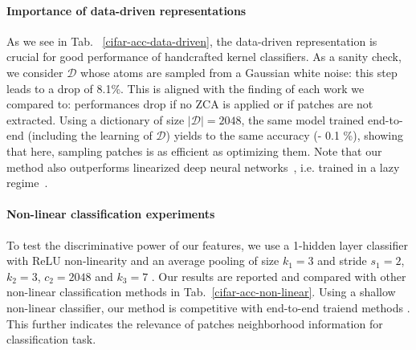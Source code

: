 \documentclass{article} %
\begin{document}
\paragraph{Importance of data-driven representations}
As we see in Tab. ~\ref{cifar-acc-data-driven}, the data-driven representation is crucial for good performance of handcrafted kernel classifiers.
As a sanity check, we consider $\mathcal{D}$ whose atoms are sampled from  a  Gaussian white noise: this  step leads to a drop of  8.1\%. This is aligned with the finding of each work we compared to: performances drop if no ZCA  is applied or if patches are not extracted. Using a dictionary of size $|\mathcal{D}| = 2048$, the same model trained end-to-end  (including the learning of $\mathcal{D}$) yields to the same accuracy (- 0.1 \%), showing that here, sampling  patches is as efficient as optimizing them. Note that our method also outperforms linearized deep neural networks~\citep{samarin2020empirical}, i.e. trained in a lazy regime~\citep{chizat2019lazy}.
\paragraph{Non-linear classification experiments}
To test the discriminative power of our features, we  use a 1-hidden layer classifier with ReLU non-linearity and an average pooling of size $k_1=3$ and stride $s_1=2$, $k_2=3$, $c_2=2048$ and $k_3=7$ .
Our results are reported and compared with other non-linear classification methods in Tab.~\ref{cifar-acc-non-linear}.
Using a shallow non-linear classifier, our method is competitive with end-to-end traiend methods \citep{li2019enhanced,shankar2020neural,krizhevsky2012imagenet}.
This further indicates the relevance of patches neighborhood information for classification task.
\end{document}

